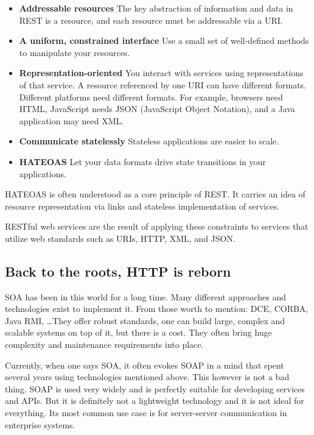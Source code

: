 	\begin{itemize}
	  	\item \textbf{Addressable resources} 
	  	The key abstraction of information and data in REST is a resource, and each resource must be addressable via a
	  	\gls{URI}.
		\item \textbf{A uniform, constrained interface}
		Use a small set of well-defined methods to manipulate your resources.
		\item \textbf{Representation-oriented}
		You interact with services using representations of that service. A resource referenced by one URI can have different
		formats. Different platforms need different formats. For example, browsers need HTML, JavaScript needs JSON
		(JavaScript Object Notation), and a Java application may need XML.
		\item \textbf{Communicate statelessly}
		Stateless applications are easier to scale.
		\item \textbf{\gls{HATEOAS}}
		Let your data formats drive state transitions in your applications.
	\end{itemize}
	
	\gls{HATEOAS} is often understood as a core principle of \gls{REST}. It carries an idea of resource representation via
	links and stateless implementation of services.
	
	RESTful web services are the result of applying these constraints to services that utilize web standards such as
	\gls{URI}s, \gls{HTTP}, \gls{XML}, and \gls{JSON}.
	
	\subsection{Back to the roots, HTTP is reborn}
	
	\gls{SOA} has been in this world for a long time. Many different approaches and technologies exist to implement it.
	From those worth to mention: DCE, CORBA, Java RMI, \ldots They offer robust standards, one can build large, complex
	and scalable systems on top of it, but there is a cost. They often bring huge complexity and maintenance requirements
	into place.
	
	Currently, when one says \gls{SOA}, it often evokes \gls{SOAP} in a mind that spent several years using technologies
	mentioned above. This however is not a bad thing. \gls{SOAP} is used very widely and is perfectly suitable for
	developing services and \gls{API}s. But it is definitely not a lightweight technology and it is not ideal for
	everything. Its most common use case is for server-server communication in enterprise systems.
	
